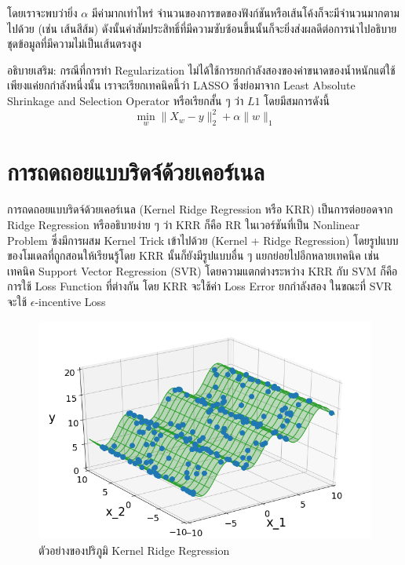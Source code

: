 \noindent โดยเราจะพบว่ายิ่ง $\alpha$ มีค่ามากเท่าไหร่ จำนวนของการขดของฟังก์ชันหรือเส้นโค้งก็จะมีจำนวนมากตามไปด้วย (เช่น เส้นสีส้ม) ดังนั้นค่าสัมประสิทธิ์ที่มีความซับซ้อนขึ้นนั้นก็จะยิ่งส่งผลดีต่อการนำไปอธิบายชุดข้อมูลที่มีความไม่เป็นเส้นตรงสูง

อธิบายเสริม: กรณีที่การทำ Regularization ไม่ได้ใช้การยกกำลังสองของค่าขนาดของน้ำหนักแต่ใช้เพียงแค่ยกกำลังหนึ่งนั้น เราจะเรียกเทคนิคนี้ว่า LASSO ซึ่งย่อมาจาก Least Absolute Shrinkage and Selection Operator หรือเรียกสั้น ๆ ว่า $L1$ โดยมีสมการดังนี้
%
\begin{equation}
    \min_{w} \lVert X_{w} - y \rVert_{2}^{2} + \alpha \lVert w \rVert_{1}
\end{equation}

\section{การถดถอยแบบริดจ์ด้วยเคอร์เนล}
\label{sec:kernel_ridge}

การถดถอยแบบริดจ์ด้วยเคอร์เนล (Kernel Ridge Regression หรือ KRR) เป็นการต่อยอดจาก Ridge Regression หรืออธิบายง่าย ๆ ว่า KRR ก็คือ RR ในเวอร์ชันที่เป็น Nonlinear Problem ซึ่งมีการผสม Kernel Trick เข้าไปด้วย (Kernel + Ridge Regression) โดยรูปแบบของโมเดลที่ถูกสอนให้เรียนรู้โดย KRR นั้นก็ยังมีรูปแบบอื่น ๆ แยกย่อยไปอีกหลายเทคนิค เช่น เทคนิค Support Vector Regression (SVR) โดยความแตกต่างระหว่าง KRR กับ SVM ก็คือการใช้ Loss Function ที่ต่างกัน โดย KRR จะใช้ค่า Loss Error ยกกำลังสอง ในขณะที่ SVR จะใช้ $\epsilon$-incentive Loss

\begin{figure}[H]
    \centering
    \includegraphics[width=0.65\linewidth]{fig/krr_space.png}
    \caption{ตัวอย่างของปริภูมิ Kernel Ridge Regression}
    \label{fig:krr_space}
\end{figure}

